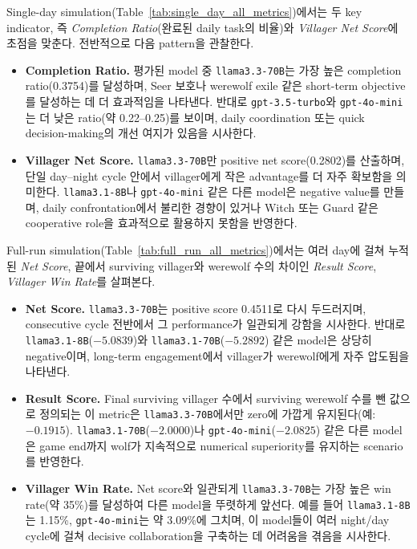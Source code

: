 Single-day simulation(Table~\ref{tab:single_day_all_metrics})에서는 두 key indicator, 즉 \emph{Completion Ratio}(완료된 daily task의 비율)와 \emph{Villager Net Score}에 초점을 맞춘다. 전반적으로 다음 pattern을 관찰한다.

\begin{itemize}
    \item \textbf{Completion Ratio.}
    평가된 model 중 \texttt{llama3.3-70B}는 가장 높은 completion ratio(0.3754)를 달성하며, Seer 보호나 werewolf exile 같은 short-term objective를 달성하는 데 더 효과적임을 나타낸다. 반대로 \texttt{gpt-3.5-turbo}와 \texttt{gpt-4o-mini}는 더 낮은 ratio(약 0.22--0.25)를 보이며, daily coordination 또는 quick decision-making의 개선 여지가 있음을 시사한다.

    \item \textbf{Villager Net Score.}
    \texttt{llama3.3-70B}만 positive net score(0.2802)를 산출하며, 단일 day--night cycle 안에서 villager에게 작은 advantage를 더 자주 확보함을 의미한다. \texttt{llama3.1-8B}나 \texttt{gpt-4o-mini} 같은 다른 model은 negative value를 만들며, daily confrontation에서 불리한 경향이 있거나 Witch 또는 Guard 같은 cooperative role을 효과적으로 활용하지 못함을 반영한다.
\end{itemize}

Full-run simulation(Table~\ref{tab:full_run_all_metrics})에서는 여러 day에 걸쳐 누적된 \emph{Net Score}, 끝에서 surviving villager와 werewolf 수의 차이인 \emph{Result Score}, \emph{Villager Win Rate}를 살펴본다.

\begin{itemize}
    \item \textbf{Net Score.}
    \texttt{llama3.3-70B}는 positive score 0.4511로 다시 두드러지며, consecutive cycle 전반에서 그 performance가 일관되게 강함을 시사한다. 반대로 \texttt{llama3.1-8B}($-5.0839$)와 \texttt{llama3.1-70B}($-5.2892$) 같은 model은 상당히 negative이며, long-term engagement에서 villager가 werewolf에게 자주 압도됨을 나타낸다.

    \item \textbf{Result Score.}
    Final surviving villager 수에서 surviving werewolf 수를 뺀 값으로 정의되는 이 metric은 \texttt{llama3.3-70B}에서만 zero에 가깝게 유지된다(예: $-0.1915$). \texttt{llama3.1-70B}($-2.0000$)나 \texttt{gpt-4o-mini}($-2.0825$) 같은 다른 model은 game end까지 wolf가 지속적으로 numerical superiority를 유지하는 scenario를 반영한다.

    \item \textbf{Villager Win Rate.}
    Net score와 일관되게 \texttt{llama3.3-70B}는 가장 높은 win rate(약 35\%)를 달성하여 다른 model을 뚜렷하게 앞선다. 예를 들어 \texttt{llama3.1-8B}는 1.15\%, \texttt{gpt-4o-mini}는 약 3.09\%에 그치며, 이 model들이 여러 night/day cycle에 걸쳐 decisive collaboration을 구축하는 데 어려움을 겪음을 시사한다.
\end{itemize}

